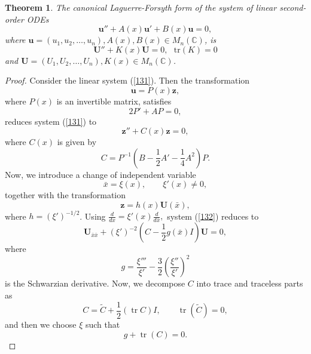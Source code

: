 \documentclass[12pt]{article}
\newtheorem{theorem}{Theorem}[section]
\begin{document}
\begin{theorem}%
The canonical Laguerre-Forsyth form of the system of linear second-order ODEs
\begin{equation}\label{131}
\mathbf{u}''+A(x)\mathbf{u}'+B(x)\mathbf{u}=0,
\end{equation}
where
$\mathbf{u}=
(u_1, u_2,\dots,u_n),
A(x),B(x)\in M_{n}(\mathbb{C})$, is 
\begin{equation}
\mathbf{U}''+K(x)\mathbf{U}=0, ~~~\text{tr}(K)=0
\end{equation}
and
$\mathbf{U}=
(U_1, U_2,\dots,U_n),
K(x)\in M_{n}(\mathbb{C})$. 
\end{theorem}
\begin{proof}
Consider the linear system (\ref{131}). Then the transformation
\begin{equation}\label{130}
\mathbf{u}=P(x)\mathbf{z},
\end{equation}
where $P(x)$ is an invertible matrix, satisfies
\begin{equation}
2P'+AP=0,
\end{equation}
  reduces system (\ref{131}) to 
\begin{equation}\label{132}
\mathbf{z}''+C(x)\mathbf{z}=0,
\end{equation}
where $C(x)$ is given by
\begin{equation}
C=
P^{-1}
\left(
B-\frac12A'
-\frac14A^2
\right)P.
\end{equation}
Now, we introduce a change of independent variable
\begin{equation}
\bar{x}=\xi(x),
\qquad
\xi'(x)\neq0,
\end{equation}
together with the transformation
\begin{equation}
\textbf{z}=h(x)\textbf{U}(\bar{x}),
\end{equation}
where $h=(\xi')^{-1/2}$. Using $
\frac{d}{dx}=\xi'(x)\frac{d}{d\bar{x}},$ system (\ref{132}) reduces to 
\begin{equation}
\mathbf{U}_{\bar{x}\bar{x}}
+
(\xi')^{-2}
\left(
C-\frac12g(\bar{x})I
\right)\mathbf{U}=0,
\end{equation}
where
\begin{equation}
g
=
\frac{\xi'''}{\xi'}-\frac32
\left(
\frac{\xi''}{\xi'}
\right)^2
\end{equation}
is the Schwarzian derivative. Now, we decompose $C$ into trace and traceless parts as
\begin{equation}
C=
\widetilde{C}
+
\frac12(\operatorname{tr}C)I,
\qquad
\operatorname{tr}(\widetilde{C})=0,
\end{equation}
and then we choose $\xi$ such that
\begin{equation}
g
+
\operatorname{tr}(C)
=0.
\end{equation}


\end{proof}
\end{document}
